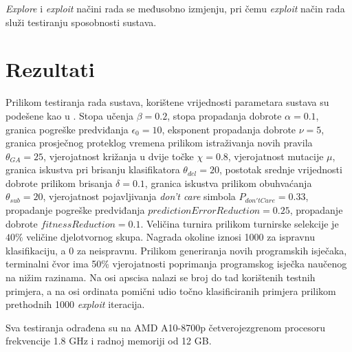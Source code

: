 \documentclass[times, utf8, zavrsni]{fer}
\begin{document}
\emph{Explore} i \emph{exploit} načini rada se međusobno izmjenju, pri čemu \emph{exploit} način rada služi testiranju sposobnosti sustava.

\chapter{Rezultati}
Prilikom testiranja rada sustava, korištene vrijednosti parametara sustava su podešene kao u \citep{4}.
Stopa učenja $\beta = 0.2$, stopa propadanja dobrote $\alpha = 0.1$, granica pogreške predviđanja $\epsilon_{0} = 10$, eksponent propadanja dobrote $\nu = 5$, granica prosječnog proteklog vremena prilikom istraživanja novih pravila $\theta_{GA} = 25$, vjerojatnost križanja u dvije točke $\chi = 0.8$, vjerojatnost mutacije $\mu$, granica iskustva pri brisanju klasifikatora $\theta_{del} = 20$, postotak srednje vrijednosti dobrote prilikom brisanja $\delta = 0.1$, granica iskustva prilikom obuhvaćanja $\theta_{sub} = 20$, vjerojatnost pojavljivanja \emph{don't care} simbola $P_{don'tCare} = 0.33$, propadanje pogreške predviđanja $predictionErrorReduction = 0.25$, propadanje dobrote $fitnessReduction = 0.1$.
Veličina turnira prilikom turnirske selekcije je $40\%$ veličine djelotvornog skupa.
Nagrada okoline iznosi 1000 za ispravnu klasifikaciju, a 0 za neispravnu.
Prilikom generiranja novih programskih isječaka, terminalni čvor ima 50\% vjerojatnosti poprimanja programskog isječka naučenog na nižim razinama.
Na osi apscisa nalazi se broj do tad korištenih testnih primjera, a na osi ordinata pomični udio točno klasificiranih primjera prilikom prethodnih 1000 \emph{exploit} iteracija.

Sva testiranja odrađena su na AMD A10-8700p četverojezgrenom procesoru frekvencije 1.8 GHz i radnoj memoriji od 12 GB.
\end{document}
